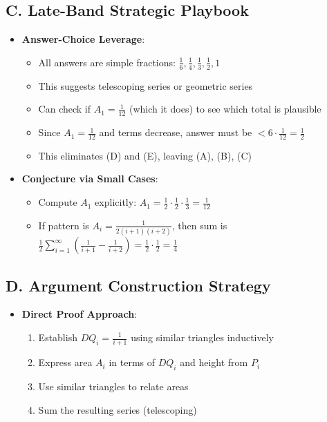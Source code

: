 \documentclass[]{article}
\begin{document}
\begin{strategicbox}
\subsection*{C. Late-Band Strategic Playbook}
\begin{itemize}[leftmargin=*]
    \item \textbf{Answer-Choice Leverage}: 
    \begin{itemize}
        \item All answers are simple fractions: $\frac{1}{6}, \frac{1}{4}, \frac{1}{3}, \frac{1}{2}, 1$
        \item This suggests telescoping series or geometric series
        \item Can check if $A_1 = \frac{1}{12}$ (which it does) to see which total is plausible
        \item Since $A_1 = \frac{1}{12}$ and terms decrease, answer must be $< 6 \cdot \frac{1}{12} = \frac{1}{2}$
        \item This eliminates (D) and (E), leaving (A), (B), (C)
    \end{itemize}
    
    \item \textbf{Conjecture via Small Cases}:
    \begin{itemize}
        \item Compute $A_1$ explicitly: $A_1 = \frac{1}{2} \cdot \frac{1}{2} \cdot \frac{1}{3} = \frac{1}{12}$
        \item If pattern is $A_i = \frac{1}{2(i+1)(i+2)}$, then sum is $\frac{1}{2}\sum_{i=1}^{\infty} \left(\frac{1}{i+1} - \frac{1}{i+2}\right) = \frac{1}{2} \cdot \frac{1}{2} = \frac{1}{4}$
    \end{itemize}
\end{itemize}

\subsection*{D. Argument Construction Strategy}
\begin{itemize}[leftmargin=*]
    \item \textbf{Direct Proof Approach}:
    \begin{enumerate}
        \item Establish $DQ_i = \frac{1}{i+1}$ using similar triangles inductively
        \item Express area $A_i$ in terms of $DQ_i$ and height from $P_i$
        \item Use similar triangles to relate areas
        \item Sum the resulting series (telescoping)
    \end{enumerate}
\end{itemize}


\end{strategicbox}
\end{document}
